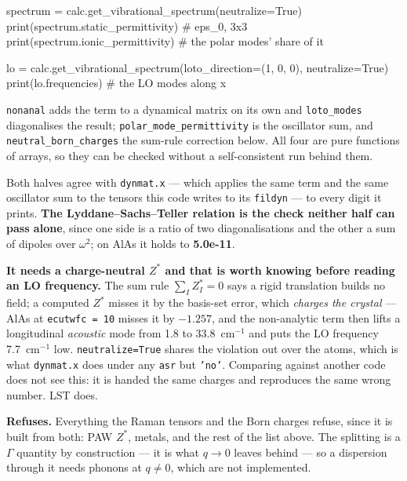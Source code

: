 \documentclass[11pt,a4paper]{article}
\newcommand{\code}[1]{\texttt{\small #1}}
\begin{document}
\begin{pycode}
spectrum = calc.get_vibrational_spectrum(neutralize=True)
print(spectrum.static_permittivity)          # eps_0, 3x3
print(spectrum.ionic_permittivity)           # the polar modes' share of it

lo = calc.get_vibrational_spectrum(loto_direction=(1, 0, 0), neutralize=True)
print(lo.frequencies)                        # the LO modes along x
\end{pycode}

\code{nonanal} adds the term to a dynamical matrix on its own and
\code{loto\_modes} diagonalises the result; \code{polar\_mode\_permittivity}
is the oscillator sum, and \code{neutral\_born\_charges} the sum-rule
correction below. All four are pure functions of arrays, so they can be checked
without a self-consistent run behind them.

Both halves agree with \code{dynmat.x} --- which applies the same term and the
same oscillator sum to the tensors this code writes to its \code{fildyn} --- to
every digit it prints. \textbf{The Lyddane--Sachs--Teller relation is the check
neither half can pass alone}, since one side is a ratio of two diagonalisations
and the other a sum of dipoles over $\omega^2$; on AlAs it holds to
\textbf{5.0e-11}.

\textbf{It needs a charge-neutral $Z^{\ast}$ and that is worth knowing before
reading an LO frequency.} The sum rule $\sum_I Z^{\ast}_I = 0$ says a rigid
translation builds no field; a computed $Z^{\ast}$ misses it by the basis-set
error, which \emph{charges the crystal} --- AlAs at \code{ecutwfc = 10} misses
it by $-1.257$, and the non-analytic term then lifts a longitudinal
\emph{acoustic} mode from 1.8 to 33.8~cm$^{-1}$ and puts the LO frequency
7.7~cm$^{-1}$ low. \code{neutralize=True} shares the violation out over the
atoms, which is what \code{dynmat.x} does under any \code{asr} but
\code{'no'}. Comparing against another code does not see this: it is handed the
same charges and reproduces the same wrong number. LST does.

\begin{refuses}
\textbf{Refuses.} Everything the Raman tensors and the Born charges refuse,
since it is built from both: PAW $Z^{\ast}$, metals, and the rest of the list
above. The splitting is a $\Gamma$ quantity by construction --- it is what
$q\to0$ leaves behind --- so a dispersion through it needs phonons at
$q\neq0$, which are not implemented.
\end{refuses}
\end{document}
